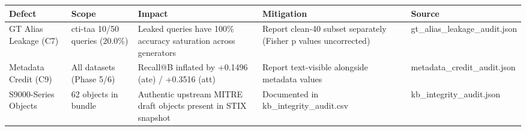 \begin{tabular}{lllll}
\toprule
Defect & Scope & Impact & Mitigation & Source \\
\midrule
GT Alias Leakage (C7) & cti-taa 10/50 queries (20.0\%) & Leaked queries have 100\% accuracy saturation across generators & Report clean-40 subset separately (Fisher p values uncorrected) & gt\_alias\_leakage\_audit.json \\
Metadata Credit (C9) & All datasets (Phase 5/6) & Recall@B inflated by +0.1496 (ate) / +0.3516 (att) & Report text-visible alongside metadata values & metadata\_credit\_audit.json \\
S9000-Series Objects & 62 objects in bundle & Authentic upstream MITRE draft objects present in STIX snapshot & Documented in kb\_integrity\_audit.csv & kb\_integrity\_audit.json \\
\bottomrule
\end{tabular}
